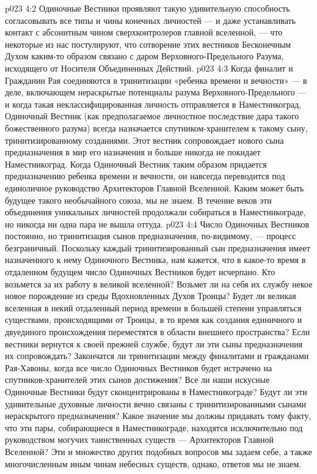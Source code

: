 \vs p023 4:2 Одиночные Вестники проявляют такую удивительную способность согласовывать все типы и чины конечных личностей --- и даже устанавливать контакт с абсонитным чином сверхконтролеров главной вселенной, --- что некоторые из нас постулируют, что сотворение этих вестников Бесконечным Духом каким\hyp{}то образом связано с даром Верховного\hyp{}Предельного Разума, исходящего от Носителя Объединенных Действий.
\vs p023 4:3 \pc Когда финалит и Гражданин Рая соединяются в тринитизации «ребенка времени и вечности» --- в деле, включающем нераскрытые потенциалы разума Верховного\hyp{}Предельного --- и когда такая неклассифицированная личность отправляется в Наместникоград, Одиночный Вестник (как предполагаемое личностное последствие дара такого божественного разума) всегда назначается спутником\hyp{}хранителем к такому сыну, тринитизированному созданиями. Этот вестник сопровождает нового сына предназначения в мир его назначения и больше никогда не покидает Наместникоград. Когда Одиночный Вестник таким образом придается предназначению ребенка времени и вечности, он навсегда переводится под единоличное руководство Архитекторов Главной Вселенной. Каким может быть будущее такого необычайного союза, мы не знаем. В течение веков эти объединения уникальных личностей продолжали собираться в Наместникограде, но никогда ни одна пара не вышла оттуда.
\vs p023 4:4 Число Одиночных Вестников постоянно, но тринитизация сынов предназначения, по\hyp{}видимому, --- процесс безграничный. Поскольку каждый тринитизированный сын предназначения имеет назначенного к нему Одиночного Вестника, нам кажется, что в какое\hyp{}то время в отдаленном будущем число Одиночных Вестников будет исчерпано. Кто возьмется за их работу в великой вселенной? Возьмет ли на себя их службу некое новое порождение из среды Вдохновленных Духов Троицы? Будет ли великая вселенная в некий отдаленный период времени в большей степени управляться существами, происходящими от Троицы, в то время как создания единичного и двуединого происхождения переместятся в области внешнего пространства? Если вестники вернутся к своей прежней службе, будут ли эти сыны предназначения их сопровождать? Закончатся ли тринитизации между финалитами и гражданами Рая\hyp{}Хавоны, когда все число Одиночных Вестников будет истрачено на спутников\hyp{}хранителей этих сынов достижения? Все ли наши искусные Одиночные Вестники будут сконцентрированы в Наместникограде? Будут ли эти удивительные духовные личности вечно связаны с тринитизированными сынами нераскрытого предназначения? Какое значение мы должны придавать тому факту, что эти пары, собирающиеся в Наместникограде, находятся исключительно под руководством могучих таинственных существ --- Архитекторов Главной Вселенной? Эти и множество других подобных вопросов мы задаем себе, а также многочисленным иным чинам небесных существ, однако, ответов мы не знаем.
